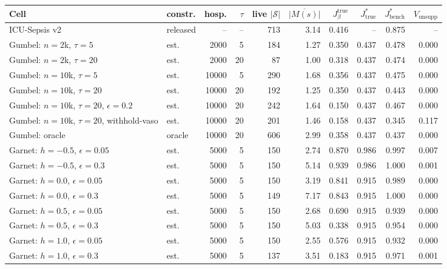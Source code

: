 \begin{tabular}{llrrrrrrrr}
\toprule
Cell & constr. & hosp. & $\tau$ & live $|\mathcal S|$ & $\overline{|M(s)|}$ & $J_{\beta}^{\mathrm{true}}$ & $J^{*}_{\mathrm{true}}$ & $J^{*}_{\mathrm{bench}}$ & $V_{\mathrm{unsupp}}$ \\
\midrule
ICU-Sepsis v2 & released & -- & -- & 713 & 3.14 & 0.416 & -- & 0.875 & -- \\
Gumbel: $n{=}2$k, $\tau{=}5$ & est. & 2000 & 5 & 184 & 1.27 & 0.350 & 0.437 & 0.478 & 0.000 \\
Gumbel: $n{=}2$k, $\tau{=}20$ & est. & 2000 & 20 & 87 & 1.00 & 0.318 & 0.437 & 0.474 & 0.000 \\
Gumbel: $n{=}10$k, $\tau{=}5$ & est. & 10000 & 5 & 290 & 1.68 & 0.356 & 0.437 & 0.475 & 0.000 \\
Gumbel: $n{=}10$k, $\tau{=}20$ & est. & 10000 & 20 & 192 & 1.25 & 0.350 & 0.437 & 0.443 & 0.000 \\
Gumbel: $n{=}10$k, $\tau{=}20$, $\epsilon{=}0.2$ & est. & 10000 & 20 & 242 & 1.64 & 0.150 & 0.437 & 0.467 & 0.000 \\
Gumbel: $n{=}10$k, $\tau{=}20$, withhold-vaso & est. & 10000 & 20 & 201 & 1.46 & 0.158 & 0.437 & 0.345 & 0.117 \\
Gumbel: oracle & oracle & 10000 & 20 & 606 & 2.99 & 0.358 & 0.437 & 0.437 & 0.000 \\
Garnet: $h{=}{-}0.5$, $\epsilon{=}0.05$ & est. & 5000 & 5 & 150 & 2.74 & 0.870 & 0.986 & 0.997 & 0.007 \\
Garnet: $h{=}{-}0.5$, $\epsilon{=}0.3$ & est. & 5000 & 5 & 150 & 5.14 & 0.939 & 0.986 & 1.000 & 0.001 \\
Garnet: $h{=}0.0$, $\epsilon{=}0.05$ & est. & 5000 & 5 & 150 & 3.19 & 0.841 & 0.915 & 0.989 & 0.000 \\
Garnet: $h{=}0.0$, $\epsilon{=}0.3$ & est. & 5000 & 5 & 149 & 7.17 & 0.843 & 0.915 & 1.000 & 0.000 \\
Garnet: $h{=}0.5$, $\epsilon{=}0.05$ & est. & 5000 & 5 & 150 & 2.68 & 0.690 & 0.915 & 0.939 & 0.000 \\
Garnet: $h{=}0.5$, $\epsilon{=}0.3$ & est. & 5000 & 5 & 150 & 5.03 & 0.338 & 0.915 & 0.954 & 0.000 \\
Garnet: $h{=}1.0$, $\epsilon{=}0.05$ & est. & 5000 & 5 & 150 & 2.55 & 0.576 & 0.915 & 0.932 & 0.000 \\
Garnet: $h{=}1.0$, $\epsilon{=}0.3$ & est. & 5000 & 5 & 137 & 3.51 & 0.183 & 0.915 & 0.971 & 0.001 \\
\bottomrule
\end{tabular}
